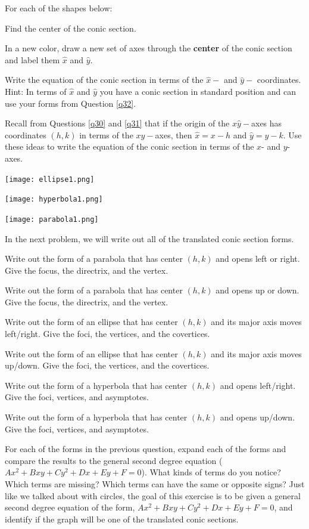 \bq For each of the shapes below:
\be
\item Find the center of the conic section.
\item In a new color, draw a new set of axes through the \textbf{center} of the conic section and label them $\hat{x}$ and $\hat{y}$.
\item Write the equation of the conic section in terms of the $\hat{x}-$ and $\hat{y}-$ coordinates. Hint: In terms of $\hat{x}$ and $\hat{y}$ you have a conic section in standard position and can use your forms from Question \ref{q32}.
\item Recall from Questions \ref{q30} and \ref{q31} that if the origin of the $\hat{x}\hat{y}-$axes has coordinates  $(h,k)$ in terms of the $xy-$axes, then $\hat{x} =x-h$ and $\hat{y}=y-k$. Use these ideas to write the equation of the conic section in terms of the $x$- and $y$-axes.
\ee
\begin{center}\texttt{[image: ellipse1.png]}

\texttt{[image: hyperbola1.png]}

\texttt{[image: parabola1.png]} \end{center}
\eq
In the next problem, we will write out all of the translated conic section forms.
\bq \be
\item Write out the form of a parabola that has center $(h,k)$ and opens left or right. Give the focus, the directrix, and the vertex.
\item Write out the form of a parabola that has center $(h,k)$ and opens up or down. Give the focus, the directrix, and the vertex.
\item Write out the form of an ellipse that has center $(h,k)$ and its major axis moves left/right. Give the foci, the vertices, and the covertices.
\item Write out the form of an ellipse that has center $(h,k)$ and its major axis moves up/down. Give the foci, the vertices, and the covertices.
\item Write out the form of a hyperbola that has center $(h,k)$ and opens left/right. Give the foci, vertices, and asymptotes.
\item Write out the form of a hyperbola that has center $(h,k)$ and opens up/down. Give the foci, vertices, and asymptotes.
\ee
\eq

\bq For each of the forms in the previous question, expand each of the forms  and compare the results to the general second degree equation ($Ax^2+Bxy+Cy^2+Dx+Ey+F=0$). What kinds of terms do you notice? Which terms are missing? Which terms can have the same or opposite signs? Just like we talked about with circles, the goal of this exercise is to be given a general second degree equation of the form, $Ax^2+Bxy+Cy^2+Dx+Ey+F=0$, and identify if the graph will be one of the translated conic sections.

